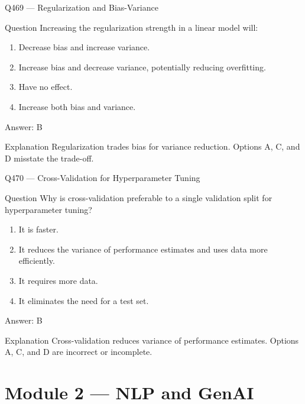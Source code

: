 \documentclass[aspectratio=169,8pt]{beamer}
\begin{document}
	\begin{frame}{Q469 --- Regularization and Bias-Variance}
		\begin{block}{Question}
			Increasing the regularization strength in a linear model will:
			\begin{enumerate}
				\item Decrease bias and increase variance.
				\item Increase bias and decrease variance, potentially reducing overfitting.
				\item Have no effect.
				\item Increase both bias and variance.
			\end{enumerate}
		\end{block}
		\begin{exampleblock}{Answer: B}\end{exampleblock}
		\begin{block}{Explanation}
			Regularization trades bias for variance reduction. Options A, C, and D misstate the trade-off.
		\end{block}
	\end{frame}
	
	\begin{frame}{Q470 --- Cross-Validation for Hyperparameter Tuning}
		\begin{block}{Question}
			Why is cross-validation preferable to a single validation split for hyperparameter tuning?
			\begin{enumerate}
				\item It is faster.
				\item It reduces the variance of performance estimates and uses data more efficiently.
				\item It requires more data.
				\item It eliminates the need for a test set.
			\end{enumerate}
		\end{block}
		\begin{exampleblock}{Answer: B}\end{exampleblock}
		\begin{block}{Explanation}
			Cross-validation reduces variance of performance estimates. Options A, C, and D are incorrect or incomplete.
		\end{block}
	\end{frame}
	
	\section{Module 2 --- NLP and GenAI}
	
\end{document}
